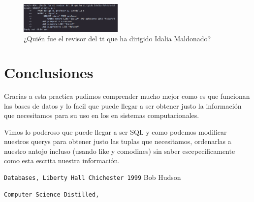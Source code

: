 \documentclass[12pt, fleqn]{article}                             %
\begin{document}
        \begin{figure}[ht!]
            \centering
            \includegraphics[width=0.45\textwidth]{BD4Reporte14}
            \caption{¿Quién fue el revisor del tt que ha dirigido Idalia Maldonado?}
        \end{figure}






\clearpage
\section{Conclusiones}

    Gracias a esta practica pudimos comprender mucho mejor como es que funcionan las bases de datos
    y lo facil que puede llegar a ser obtener justo la información que necesitamos para su uso en los
    en sistemas computacionales.

    Vimos lo poderoso que puede llegar a ser SQL y como podemos modificar nuestros querys para obtener
    justo las tuplas que necesitamos, ordenarlas a nuestro antojo incluso (usando like y comodines)
    sin saber escepecificamente como esta escrita nuestra información.





\begin{thebibliography}{9}

        \texttt{Databases, Liberty Hall Chichester 1999}
        Bob Hudson

        \texttt{Computer Science Distilled,}


     

\end{thebibliography}
\end{document}
